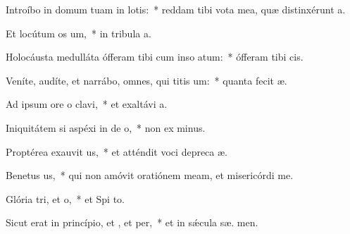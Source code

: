 \item Introíbo in domum tuam in lotis:~* reddam tibi vota mea, quæ distinxérunt  a.
\item Et locútum  os um,~* in tribula a.
\item Holocáusta medulláta ófferam tibi cum inso atum:~* ófferam tibi   cis.
\item Veníte, audíte, et narrábo, omnes, qui titis um:~* quanta fecit  æ.
\item Ad ipsum ore o clavi,~* et exaltávi   a.
\item Iniquitátem si aspéxi in de o,~* non ex minus.
\item Proptérea exauvit us,~* et atténdit voci depreca æ.
\item Benetus us,~* qui non amóvit oratiónem meam, et misericórdi   me.
\item Glória tri, et o,~* et Spi to.
\item Sicut erat in princípio, et , et per,~* et in sǽcula sæ. men.
